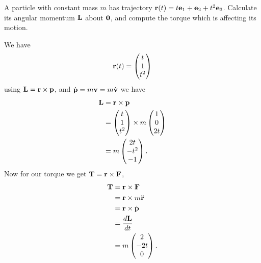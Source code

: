 \documentclass[10pt, a4paper]{article}
\begin{document}
\begin{example}
    A particle with constant mass $m$ has trajectory $\mathbf{r}(t) = t\mathbf{e}_1 + \mathbf{e}_2 + t ^ 2\mathbf{e}_3$.
    Calculate its angular momentum $\mathbf{L}$ about $\mathbf{0}$,
    and compute the torque which is affecting its motion.

    \begin{solution}
        We have
        \[
        \mathbf{r}(t) = \begin{pmatrix}
            t \\ 1 \\ t ^ 2
        \end{pmatrix}
        \]
        using $\mathbf{L} = \mathbf{r} \times \mathbf{p}$,
        and $\dot{\mathbf{p}} = m\mathbf{v} = m\dot{\mathbf{v}}$ we have
        \begin{align*}
            \mathbf{L} &= \mathbf{r} \times \mathbf{p} \\
            &= \begin{pmatrix}
                t \\ 1 \\ t ^ 2
            \end{pmatrix} \times m\begin{pmatrix}
                1 \\ 0 \\ 2t
            \end{pmatrix} \\
            &= m\begin{pmatrix}
                2t \\ -t ^ 2 \\ -1
            \end{pmatrix}.
        \end{align*}
        Now for our torque we get $\mathbf{T} = \mathbf{r} \times \mathbf{F}$,
        \begin{align*}
            \mathbf{T} &= \mathbf{r} \times \mathbf{F} \\
            &= \mathbf{r} \times m\ddot{\mathbf{r}} \\
            &= \mathbf{r} \times \dot{\mathbf{p}} \\
            &= \frac{d\mathbf{L}}{dt} \\
            &= m\begin{pmatrix}
                2 \\ -2t \\ 0
            \end{pmatrix}.
        \end{align*}
    \end{solution}
\end{example}
\end{document}
